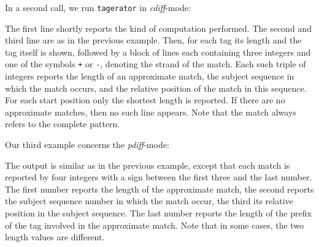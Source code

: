 \documentclass[12pt]{article}
\newcommand{\Program}[0]{\texttt{tagerator}\xspace}
\begin{document}
In a second call, we run \Program in \textit{cdiff}-mode:


The first line shortly reports the kind of computation performed. The second
and third line are as in the previous example. Then, for
each tag its length and the tag itself is shown, followed by 
a block of lines each containing three integers and one of the
symbols \texttt{+} or \texttt{-}, denoting the strand of the match.
Each such triple of integers reports the length of an approximate match,
the subject sequence in which the match occurs, and the relative position
of the match in this sequence. For each start position only the shortest 
length is reported. If there are no
approximate matches, then no such line appears. Note that the match always
refers to the complete pattern.

Our third example concerns the \textit{pdiff}-mode:


The output is similar as in the previous example, except that each match
is reported by four integers with a sign between the first three and the
last number. The first number reports the length of the
approximate match, the second reports the subject sequence number in
which the match occur, the third its relative position in the subject
sequence. The last number reports the length of the prefix 
of the tag involved in the approximate match. Note that in some cases,
the two length values are different.
\end{document}
